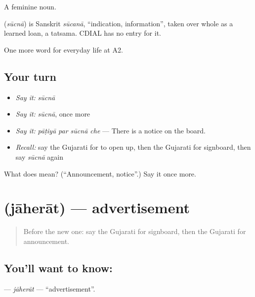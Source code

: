 A feminine noun.

\begin{cousinweb}
\textbf{} (\emph{sūcnā}) is Sanskrit \emph{sūcanā}, \textquotedblleft{}indication, information\textquotedblright{}, taken over whole as a learned loan, a tatsama. CDIAL has no entry for it.
\end{cousinweb}

\begin{grammarlens}[title={What you've built}]
One more word for everyday life at A2.
\end{grammarlens}

\subsection*{Your turn}
\begin{itemize}
\raggedright
  \item \emph{Say it:} \emph{sūcnā}
  \item \emph{Say it:} \emph{sūcnā}, once more
  \item \emph{Say it:} \emph{pāṭiyā par sūcnā che} — There is a notice on the board.
  \item \emph{Recall:} say the Gujarati for to open up, then the Gujarati for signboard, then say \emph{sūcnā} again
\end{itemize}

\begin{tcolorbox}[breakable,colback=teal!4,colframe=teal!35!black,title={Before you move on}]
What does  mean? (\textquotedblleft{}Announcement, notice\textquotedblright{}.) Say it once more.
\end{tcolorbox}
\section[\texorpdfstring{\gu{જાહેરાત} (jāherāt)}{જાહેરાત (jāherāt)}]{ (jāherāt) — advertisement}

\label{lesson:GU-C198-jaherat}



\begin{quote}
Before the new one: say the Gujarati for signboard, then the Gujarati for announcement.
\end{quote}

\subsection*{You'll want to know: }
\textbf{} — \emph{jāherāt} — \textquotedblleft{}advertisement\textquotedblright{}.

